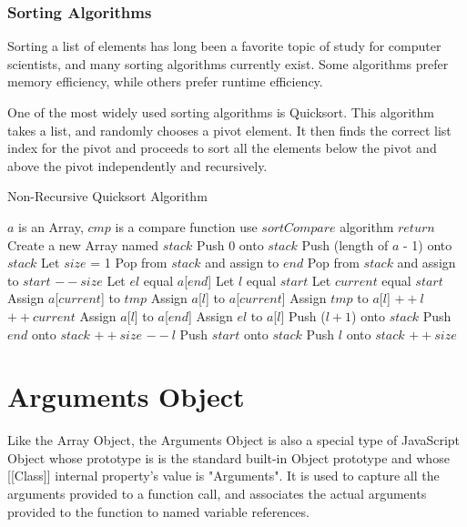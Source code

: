 \documentclass[a4paper,11pt,twoside]{report}
\begin{document}
\subsection{Sorting Algorithms}
Sorting a list of elements has long been a favorite topic of study for computer scientists, and many sorting algorithms currently exist. Some algorithms prefer memory efficiency, while others prefer runtime efficiency. 

One of the most widely used sorting algorithms is Quicksort. This algorithm takes a list, and randomly chooses a pivot element. It then finds the correct list index for the pivot and proceeds to sort all the elements below the pivot and above the pivot independently and recursively.

\begin{algorithm}
\caption{Non-Recursive Quicksort Algorithm}
\begin{algorithmic}
\REQUIRE $a$ is an Array, $cmp$ is a compare function
\STATE use $sortCompare$ algorithm
\ENDIF
{}
\STATE $return$
\ENDIF
\STATE Create a new Array named $stack$
\STATE Push 0 onto $stack$
\STATE Push (length of $a$ - 1) onto $stack$
\STATE Let $size$ = 1
\STATE Pop from $stack$ and assign to $end$
\STATE Pop from $stack$ and assign to $start$
\STATE $--size$
\STATE Let $el$ equal $a$[$end$]
\STATE Let $l$ equal $start$
\STATE Let $current$ equal $start$
\STATE Assign $a$[$current$] to $tmp$
\STATE Assign $a$[$l$] to $a$[$current$]
\STATE Assign $tmp$ to $a$[$l$]
\STATE $++l$
\ENDIF
\STATE $++current$
\ENDWHILE
\STATE Assign $a$[$l$] to $a$[$end$]
\STATE Assign $el$ to $a$[$l$]
\STATE Push ($l + 1$) onto $stack$
\STATE Push $end$ onto $stack$
\STATE $++size$
\ENDIF
\STATE $--l$
\STATE Push $start$ onto $stack$
\STATE Push $l$ onto $stack$
\STATE $++size$
\ENDIF
\ENDWHILE
\end{algorithmic}
\end{algorithm}


\chapter{Arguments Object}
Like the Array Object, the Arguments Object is also a special type of JavaScript Object whose prototype is is the standard built-in Object prototype and whose [[Class]] internal property's value is "Arguments". It is used to capture all the arguments provided to a function call, and associates the actual arguments provided to the function to named variable references. 
\end{document}
